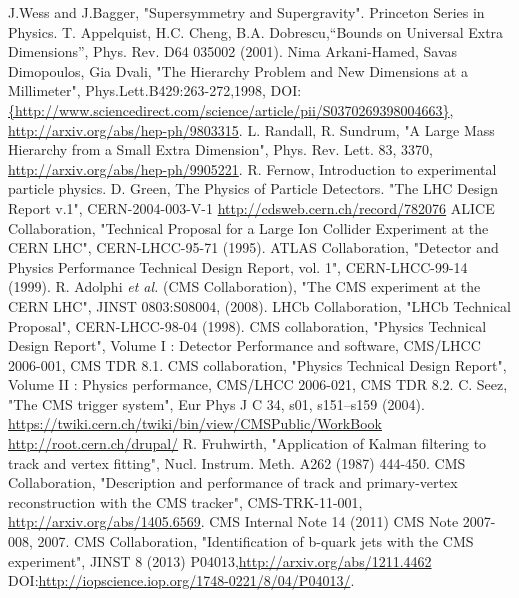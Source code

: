 \begin{thebibliography}{99}
 J.Wess and J.Bagger, "Supersymmetry and Supergravity". Princeton Series in Physics.
 T. Appelquist, H.C. Cheng, B.A. Dobrescu,“Bounds on Universal Extra Dimensions”, Phys. Rev. D64 035002 (2001).
 Nima Arkani-Hamed, Savas Dimopoulos, Gia Dvali, "The Hierarchy Problem and New Dimensions at a Millimeter", Phys.Lett.B429:263-272,1998, DOI: \url{{http://www.sciencedirect.com/science/article/pii/S0370269398004663}}, \url{http://arxiv.org/abs/hep-ph/9803315}.
 L. Randall, R. Sundrum, "A Large Mass Hierarchy from a Small Extra Dimension", Phys. Rev. Lett. 83, 3370, \url{http://arxiv.org/abs/hep-ph/9905221}.
 R. Fernow, Introduction to experimental particle physics.
 D. Green, The Physics of Particle Detectors.
 "The LHC Design Report v.1", CERN-2004-003-V-1 {\url {http://cdsweb.cern.ch/record/782076}}
 ALICE Collaboration, "Technical Proposal for a Large Ion Collider Experiment at the CERN LHC", CERN-LHCC-95-71 (1995).
ATLAS Collaboration, "Detector and Physics Performance Technical Design Report, vol. 1",
CERN-LHCC-99-14 (1999).
 R. Adolphi {\it et al.} (CMS Collaboration), "The CMS experiment at the CERN LHC", JINST 0803:S08004, (2008).
 LHCb Collaboration, "LHCb Technical Proposal", CERN-LHCC-98-04 (1998).
 CMS collaboration, "Physics Technical Design Report", Volume I : Detector Performance and software, CMS/LHCC 2006-001, CMS TDR 8.1.
 CMS collaboration, "Physics Technical Design Report", Volume II : Physics performance, CMS/LHCC 2006-021, CMS TDR 8.2.
 C. Seez, "The CMS trigger system", Eur Phys J C 34, s01, s151–s159 (2004).
 {\url{https://twiki.cern.ch/twiki/bin/view/CMSPublic/WorkBook}}
 {\url{http://root.cern.ch/drupal/}}
 R. Fruhwirth, "Application of Kalman filtering to track and vertex fitting", Nucl. Instrum. Meth. A262 (1987) 444-450.
 CMS Collaboration, "Description and performance of track and primary-vertex reconstruction with the CMS tracker", CMS-TRK-11-001, \url{http://arxiv.org/abs/1405.6569}.
 CMS Internal Note 14 (2011)
 CMS Note 2007-008, 2007.
 CMS Collaboration, "Identification of b-quark jets with the CMS experiment", JINST 8 (2013) P04013,{\url{http://arxiv.org/abs/1211.4462}} DOI:{\url{http://iopscience.iop.org/1748-0221/8/04/P04013/}}.

\end{thebibliography}
